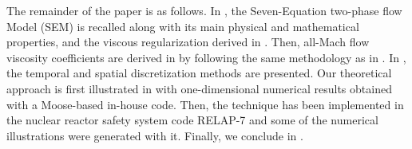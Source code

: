\documentclass[preprint,10pt]{elsarticle}
\begin{document}
%
%
The remainder of the paper is as follows. In , the Seven-Equation two-phase flow Model (SEM) is recalled along with its main 
physical and mathematical properties, and the viscous regularization derived in \cite{Marco_paper_sem}. Then, all-Mach flow viscosity coefficients are derived 
in  by following the same methodology as in \cite{DelchiniCompFluid2014-euler}. In , the temporal and spatial discretization methods are presented. 
Our theoretical approach is first illustrated in  with one-dimensional numerical results obtained with a Moose-based in-house code. Then, the technique has been implemented in the nuclear 
reactor safety system code RELAP-7 \cite{Berry_2014} and some of the numerical illustrations were generated with it.
Finally, we conclude in .
%

%
\end{document}

